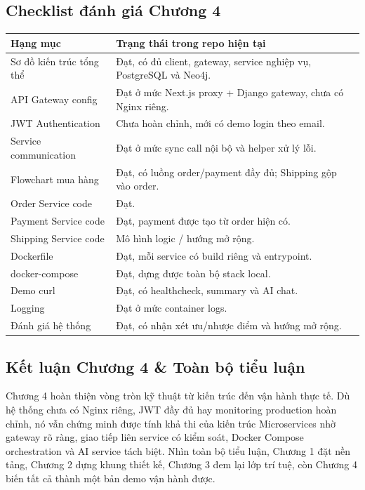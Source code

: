 \documentclass[12pt,a4paper]{article}
\begin{document}
\subsection{Checklist đánh giá Chương 4}
\begin{longtable}{p{8.4cm}p{5.2cm}}
\toprule
\textbf{Hạng mục} & \textbf{Trạng thái trong repo hiện tại} \\
\midrule
Sơ đồ kiến trúc tổng thể & Đạt, có đủ client, gateway, service nghiệp vụ, PostgreSQL và Neo4j. \\
API Gateway config & Đạt ở mức Next.js proxy + Django gateway, chưa có Nginx riêng. \\
JWT Authentication & Chưa hoàn chỉnh, mới có demo login theo email. \\
Service communication & Đạt ở mức sync call nội bộ và helper xử lý lỗi. \\
Flowchart mua hàng & Đạt, có luồng order/payment đầy đủ; Shipping gộp vào order. \\
Order Service code & Đạt. \\
Payment Service code & Đạt, payment được tạo từ order hiện có. \\
Shipping Service code & Mô hình logic / hướng mở rộng. \\
Dockerfile & Đạt, mỗi service có build riêng và entrypoint. \\
docker-compose & Đạt, dựng được toàn bộ stack local. \\
Demo curl & Đạt, có healthcheck, summary và AI chat. \\
Logging & Đạt ở mức container logs. \\
Đánh giá hệ thống & Đạt, có nhận xét ưu/nhược điểm và hướng mở rộng. \\
\bottomrule
\end{longtable}

\subsection{Kết luận Chương 4 \& Toàn bộ tiểu luận}
Chương 4 hoàn thiện vòng tròn kỹ thuật từ kiến trúc đến vận hành thực tế. Dù hệ thống chưa có Nginx riêng, JWT đầy đủ hay monitoring production hoàn chỉnh, nó vẫn chứng minh được tính khả thi của kiến trúc Microservices nhờ gateway rõ ràng, giao tiếp liên service có kiểm soát, Docker Compose orchestration và AI service tách biệt. Nhìn toàn bộ tiểu luận, Chương 1 đặt nền tảng, Chương 2 dựng khung thiết kế, Chương 3 đem lại lớp trí tuệ, còn Chương 4 biến tất cả thành một bản demo vận hành được.
\end{document}
